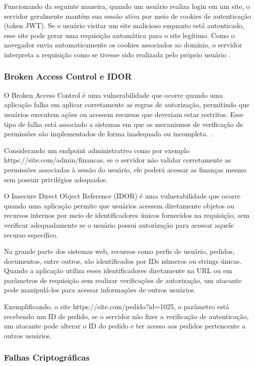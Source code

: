 Funcionando da seguinte maneira, quando um usuário realiza login em um site, o servidor geralmente mantém sua sessão ativa por meio de cookies de autenticação (token JWT). Se o usuário visitar um site malicioso enquanto está autenticado, esse site pode gerar uma requisição automática para o site legítimo. Como o navegador envia automaticamente os cookies associados ao domínio, o servidor interpreta a requisição como se tivesse sido realizada pelo próprio usuário \cite{lin:2009}.

\subsubsection{
    Broken Access Control e IDOR
}

O Broken Access Control é uma vulnerabilidade que ocorre quando uma aplicação falha em aplicar corretamente as regras de autorização, permitindo que usuários executem ações ou acessem recursos que deveriam estar restritos. Esse tipo de falha está associado a sistemas em que os mecanismos de verificação de permissões são implementados de forma inadequada ou incompleta. \cite{kusnana:2025}.

Considerando um endpoint administrativo como por exemplo https://site.com/admin/financas, se o servidor não validar corretamente as permissões associadas à sessão do usuário, ele poderá acessar as finanças mesmo sem possuir privilégios adequados.

O Insecure Direct Object Reference (IDOR) é uma vulnerabilidade que ocorre quando uma aplicação permite que usuários acessem diretamente objetos ou recursos internos por meio de identificadores únicos fornecidos na requisição, sem verificar adequadamente se o usuário possui autorização para acessar aquele recurso específico.

Na grande parte dos sistemas web, recursos como perfis de usuário, pedidos, documentos, entre outros, são identificados por IDs números ou strings únicas. Quando a aplicação utiliza esses identificadores diretamente na URL ou em parâmetros de requisição sem realizar verificações de autorização, um atacante pode manipulá-los para acessar informações de outros usuários.

Exemplificando, o site https://site.com/pedido?id=1025, o parâmetro está recebendo um ID de pedido, se o servidor não fizer a verificação de autenticação, um atacante pode alterar o ID do pedido e ter acesso aos pedidos pertencente a outros usuários.

\subsubsection{
    Falhas Criptográficas
}

